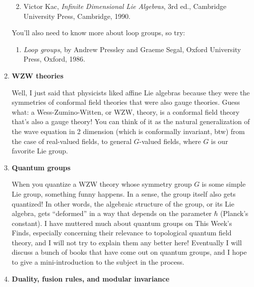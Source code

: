 \documentclass{article}
\def\tightlist{}
\begin{document}
\begin{enumerate}
  \begin{enumerate}
  \def\labelenumii{\arabic{enumii})}
  \setcounter{enumii}{1}
  \tightlist
  \item
    Victor Kac, \emph{Infinite Dimensional Lie Algebras}, 3rd ed.,
    Cambridge University Press, Cambridge, 1990.
  \end{enumerate}

  You'll also need to know more about loop groups, so try:

  \begin{enumerate}
  \def\labelenumii{\arabic{enumii})}
  \setcounter{enumii}{2}
  \tightlist
  \item
    \emph{Loop groups}, by Andrew Pressley and Graeme Segal, Oxford
    University Press, Oxford, 1986.
  \end{enumerate}
\item
  \textbf{WZW theories}

  Well, I just said that physicists liked affine Lie algebras because
  they were the symmetries of conformal field theories that were also
  gauge theories. Guess what: a Wess-Zumino-Witten, or WZW, theory, is a
  conformal field theory that's also a gauge theory! You can think of it
  as the natural generalization of the wave equation in 2 dimension
  (which is conformally invariant, btw) from the case of real-valued
  fields, to general \(G\)-valued fields, where \(G\) is our favorite
  Lie group.
\item
  \textbf{Quantum groups}

  When you quantize a WZW theory whose symmetry group \(G\) is some
  simple Lie group, something funny happens. In a sense, the group
  itself also gets quantized! In other words, the algebraic structure of
  the group, or its Lie algebra, gets ``deformed'' in a way that depends
  on the parameter \(\hbar\) (Planck's constant). I have muttered much
  about quantum groups on This Week's Finds, especially concerning their
  relevance to topological quantum field theory, and I will not try to
  explain them any better here! Eventually I will discuss a bunch of
  books that have come out on quantum groups, and I hope to give a
  mini-introduction to the subject in the process.
\item
  \textbf{Duality, fusion rules, and modular invariance}


\end{enumerate}
\end{document}
